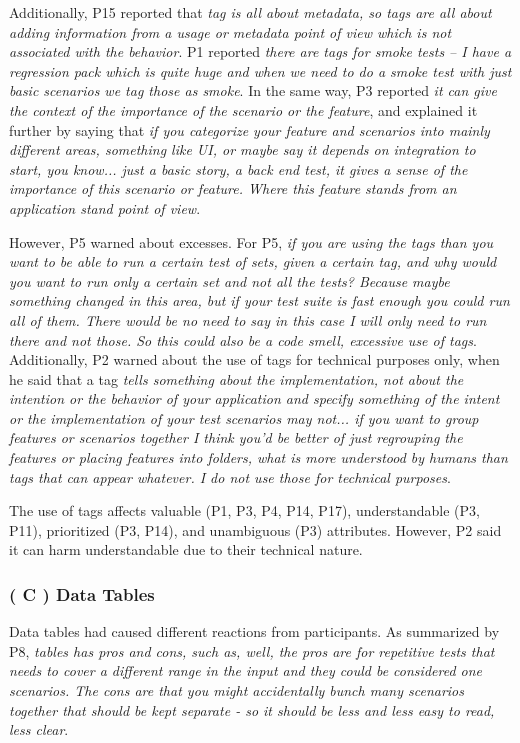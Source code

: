 Additionally, P15 reported that \textit{tag is all about metadata, so tags are all about adding information from a usage or metadata point of view which is not associated with the behavior}. P1 reported \textit{there are tags for smoke tests -- I have a regression pack which is quite huge and when we need to do a smoke test with just basic scenarios we tag those as smoke}. In the same way, P3 reported \textit{it can give the context of the importance of the scenario or the feature}, and explained it further by saying that \textit{if you categorize your feature and scenarios into mainly different areas, something like UI, or maybe say it depends on integration to start, you know... just a basic story, a back end test, it gives a sense of the importance of this scenario or feature. Where this feature stands from an application stand point of view}. 

However, P5 warned about excesses. For P5, \textit{if you are using the tags than you want to be able to run a certain test of sets, given a certain tag, and why would you want to run only a certain set and not all the tests? Because maybe something changed in this area, but if your test suite is fast enough you could run all of them. There would be no need to say in this case I will only need to run there and not those. So this could also be a code smell, excessive use of tags}. Additionally, P2 warned about the use of tags for technical purposes only, when he said that a tag \textit{tells something about the implementation, not about the intention or the behavior of your application and specify something of the intent or the implementation of your test scenarios may not... if you want to group features or scenarios together I think you'd be better of just regrouping the features or placing features into folders, what is more understood by humans than tags that can appear whatever. I do not use those for technical purposes}.

The use of tags affects valuable (P1, P3, P4, P14, P17), understandable (P3, P11), prioritized (P3, P14), and unambiguous (P3) attributes. However, P2 said it can harm understandable due to their technical nature.

\subsubsection{\textbf{( C ) Data Tables}}

Data tables had caused different reactions from participants. As summarized by P8, \textit{tables has pros and cons, such as, well, the pros are for repetitive tests that needs to cover a different range in the input and they could be considered one scenarios. The cons are that you might accidentally bunch many scenarios together that should be kept separate - so it should be less and less easy to read, less clear}.

